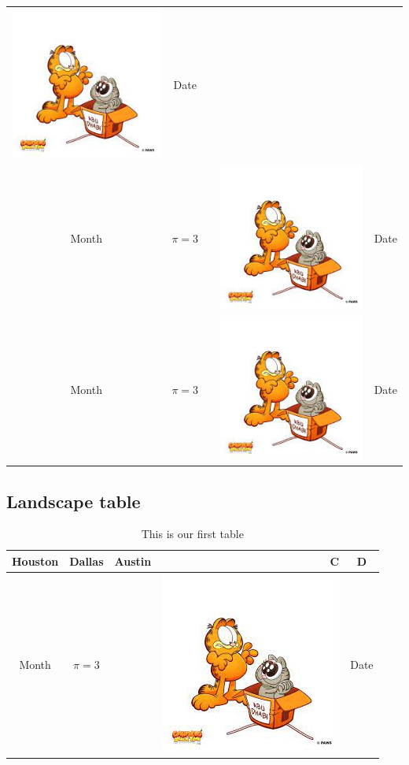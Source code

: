 \documentclass{article}
\theoremstyle{definition}
\theoremstyle{remark}
\begin{document}
\begin{longtable}{|c c|l|r|c|}
 \includegraphics[width=0.2\linewidth]{download.jpg} & Date \\Month & $\pi=3$ &  & \includegraphics[width=0.2\linewidth]{download.jpg} & Date \\Month & $\pi=3$ &  & \includegraphics[width=0.2\linewidth]{download.jpg} & Date \\
\hline
\end{longtable}

\subsection{Landscape table}

\begin{table}
\begin{center}
\caption{This is our first table}\label{tab:4}    
\begin{tabular}{|c c|l|r|c|}
\hline
Houston & Dallas & Austin & C & D \\
\hline \hline
Month & $\pi=3$ &  & \includegraphics[width=0.2\linewidth]{download.jpg} & Date \\
\hline
\end{tabular}

\end{center}
\end{table}
\end{document}
